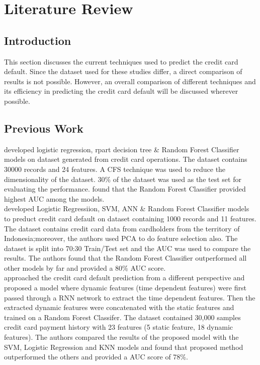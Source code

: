 \documentclass[twoside,11pt,a4paper]{article}
\begin{document}
\section{Literature Review}\label{sec:literature_review}
\subsection{Introduction}
This section discusses the current techniques used to predict the credit card default. Since the dataset used for these studies differ, a direct comparison of results is not possible. However, an overall comparison of different techniques and its efficiency in predicting the credit card default will be discussed wherever possible.

\subsection{Previous Work}
\citep{sayjadah2018credit} developed logistic regression, rpart decision tree \& Random Forest Classifier models on dataset generated from credit card operations. The dataset contains 30000 records and 24 features. A \acf{CFS} technique was used to reduce the dimensionality of the dataset. 30\% of the dataset was used as the test set for evaluating the performance. \citep{sayjadah2018credit} found that the Random Forest Classifier provided highest \acf{AUC} among the models.\\

\citep{widyadhanacredit} developed Logistic Regressiion, \acs{SVM}, \acs{ANN} \& Random Forest Classifier models to preduct credit card default on dataset containing 1000 records and 11 features. The dataset contains credit card data from cardholders from the territory of Indonesia;moreover, the authors used \acf{PCA} to do feature selection also. The dataset is split into 70:30 Train/Test set and the \acs{AUC} was used to compare the results. The authors found that the Random Forest Classifier outperformed all other models by far and provided a 80\% \acs{AUC} score.\\

\citep{hsu2019enhanced} approached the credit card default prediction from a different perspective and proposed a model where dynamic features (time dependent features) were first passed through a \acf{RNN} network to extract the time dependent features. Then the extracted dynamic features were concatenated with the static features and trained on a Random Forest Classifer. The dataset contained 30,000 samples credit card payment history with 23 features (5 static feature, 18 dynamic features). The authors compared the results of the proposed model with the \acs{SVM}, Logistic Regression and KNN models and found that proposed method outperformed the others and provided a \acs{AUC} score of 78\%.
\end{document}
